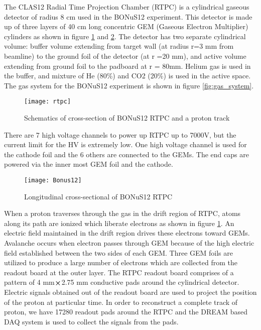 
The CLAS12 Radial Time Projection Chamber (RTPC)  is a cylindrical gaseous detector of radius 8 cm used in the BONuS12 experiment. This detector is made up of three layers of 40 cm long concentric GEM (Gaseous Electron Multiplier) cylinders as shown in figure \ref{fig:RTPC} and \ref{fig:bonus12}. The detector has two separate cylindrical volume: buffer volume extending from target wall (at radius r=3 mm from beamline) to the ground foil of the detector (at r =20 mm), and active volume extending from ground foil to the padboard at r = 80mm. Helium gas is used in the buffer, and mixture of He (80\%) and CO2 (20\%) is used in the active space. The gas system for the BONuS12 experiment is shown in figure \ref{fig:gas_system}.

\begin{figure}[H]
	\centering
	\texttt{[image: rtpc]}
	\caption{Schematics of cross-section of BONuS12 RTPC and a proton track}
	\label{fig:RTPC}
\end{figure}

There are 7 high voltage channels to power up RTPC up to 7000V, but the current limit for the HV is extremely low. One high voltage channel is used for the cathode foil and the 6 others are connected to the GEMs. The end caps are powered via the inner most GEM foil and the cathode.

\begin{figure}[H]
	\centering
	\texttt{[image: Bonus12]}
	\caption{Longitudinal cross-sectional of BONuS12 RTPC}
	\label{fig:bonus12}
\end{figure}

When a proton traverses through the gas in the drift region of RTPC, atoms along its path are ionized which liberate electrons as shown in figure \ref{fig:RTPC}. An electric field maintained in the drift region drives these electrons toward GEMs. Avalanche occurs when electron passes through GEM because of the high electric field established between the two sides of each GEM. Three GEM foils are utilized to produce a large number of electrons which are collected from the readout board at the outer layer. The RTPC readout board comprises of a pattern of 4 mm$\crossproduct$2.75 mm conductive pads around the cylindrical detector. Electric signals obtained out of the readout board are used to project the position of the proton at particular time. In order to reconstruct a complete track of proton, we have 17280 readout pads around the RTPC and the DREAM based DAQ system is used to collect the signals from the pads.

